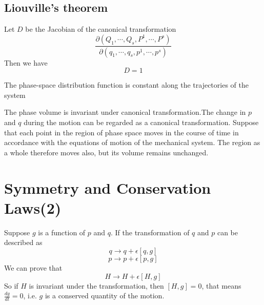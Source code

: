 \documentclass[cyan]{elegantnote}
\begin{document}
\subsection{Liouville's theorem}
\begin{newlemma}
Let $D$ be the Jacobian of the canonical transformation 
\[\frac{\partial(Q_1,\cdots,Q_s,P^1,\cdots,P^s)}{\partial(q_1,\cdots,q_s,p^1,\cdots,p^s)}\]
Then we have
\[D=1\]
\end{newlemma}

\begin{newthem}
The phase-space distribution function is constant along the trajectories of the system
\end{newthem}

\begin{newproof}
The phase volume is invariant under canonical transformation.The change in $p$ and $q$ during the motion can be regarded as a canonical transformation. Suppose that each point in the region of phase space moves in the course of time in accordance with the equations of motion of the mechanical system. The region as a whole therefore moves also, but its volume remains unchanged.
\end{newproof}

\section{Symmetry and Conservation Laws(2)}
Suppose $g$ is a function of $p$ and $q$. If the transformation of $q$ and $p$ can be described as
\[q \rightarrow q + \epsilon [q,g]\]
\[p \rightarrow p + \epsilon [p,g]\]
We can prove that 
\[H \rightarrow H + \epsilon[H,g]\]
So if $H$ is invariant under the transformation, then $[H,g] = 0$, that means $\frac{dg}{dt} = 0$, i.e. $g$ is a conserved quantity of the motion.
\end{document}
